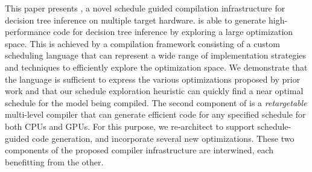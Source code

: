 This paper presents \Treebeard{}, a novel schedule guided compilation infrastructure
for decision tree inference on multiple target hardware. \Treebeard{} is able to 
generate high-performance code for decision tree inference by exploring a large optimization space. 
This is achieved by a compilation framework consisting of a 
custom scheduling language that can represent a wide range of 
implementation strategies and techniques to efficiently explore
the optimization space. We demonstrate that the language is 
sufficient to express the various optimizations proposed by prior work
and that our schedule exploration heuristic can quickly find a near 
optimal schedule for the model being compiled. 
The second component of \Treebeard{} is a \emph{retargetable} multi-level compiler that can generate efficient code 
for any specified schedule for both CPUs and GPUs. For this purpose, we re-architect \TreebeardOLD{} to
support schedule-guided code generation, and incorporate several new optimizations. These two components 
of the proposed \Treebeard{} compiler infrastructure are interwined, each benefitting from the other.
